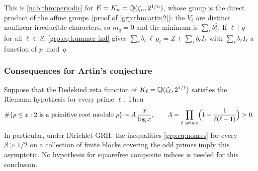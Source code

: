 This is \cref{nab:thm:periodic} for $E=K_n=\mathbb{Q}(\zeta_n,2^{1/n})$, whose group is the
direct product of the affine groups (proof of \cref{grp:thm:artin2}): the $V_\ell$ are
distinct nonlinear irreducible characters, so $m_q=0$ and the minimum is
$\sum_\ell b_\ell^2$. If $\ell\mid q$ for all $\ell\in S$, \eqref{grp:eq:kummer-ind} gives
$\sum_\ell b_\ell\,\ell\,g_\ell=Z+\sum_\ell b_\ell I_\ell$ with $\sum_\ell b_\ell I_\ell$ a
function of $p\bmod q$.

\subsubsection{Consequences for Artin's conjecture}

\begin{theorem}\label{grp:thm:artin2}
Suppose that the Dedekind zeta function of $K_\ell=\mathbb{Q}(\zeta_\ell,2^{1/\ell})$
satisfies the Riemann hypothesis for every prime $\ell$. Then
\[
 \#\{p\le x:2\text{ is a primitive root modulo }p\}\sim A\,\frac x{\log x},
 \qquad
 A=\prod_{\ell\ \mathrm{prime}}\Bigl(1-\frac1{\ell(\ell-1)}\Bigr)>0 .
\]
In particular, under Dirichlet GRH, the inequalities \eqref{grp:eq:nonres}
for every $\beta>1/2$ on a collection of finite blocks covering the odd primes
imply this asymptotic. No hypothesis for squarefree composite indices is
needed for this conclusion.
\end{theorem}

